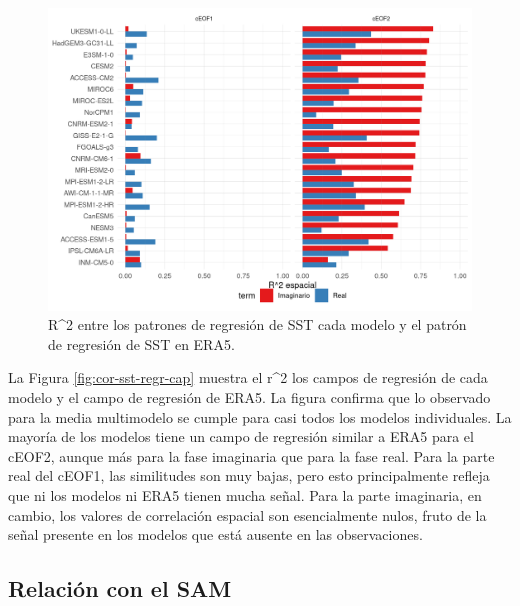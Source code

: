 \documentclass[12pt,oneside]{reedthesis}
\begin{document}
\begin{figure}
\includegraphics{figures/50-cmip6/cor-sst-regr-1} \caption{R\^{}2 entre los patrones de regresión de SST cada modelo y el patrón de regresión de SST en ERA5.}\label{fig:cor-sst-regr}
\end{figure}

La Figura \ref{fig:cor-sst-regr-cap} muestra el r\^{}2 los campos de regresión de cada modelo y el campo de regresión de ERA5.
La figura confirma que lo observado para la media multimodelo se cumple para casi todos los modelos individuales.
La mayoría de los modelos tiene un campo de regresión similar a ERA5 para el cEOF2, aunque más para la fase imaginaria que para la fase real.
Para la parte real del cEOF1, las similitudes son muy bajas, pero esto principalmente refleja que ni los modelos ni ERA5 tienen mucha señal.
Para la parte imaginaria, en cambio, los valores de correlación espacial son esencialmente nulos, fruto de la señal presente en los modelos que está ausente en las observaciones.

\hypertarget{relaciuxf3n-con-el-sam}{%
\subsection{Relación con el SAM}\label{relaciuxf3n-con-el-sam}}
\end{document}
